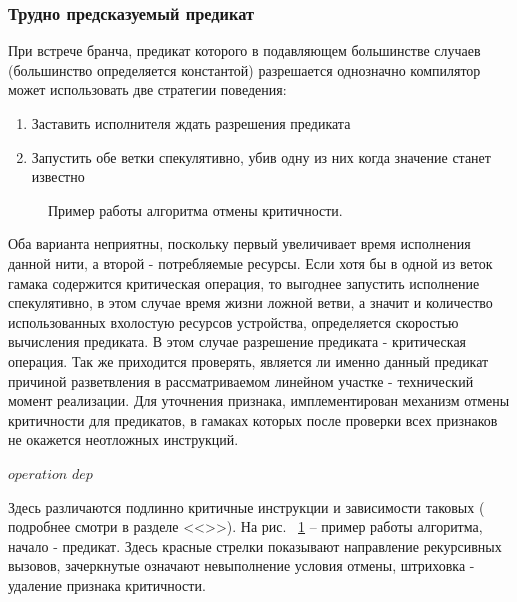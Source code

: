 \documentclass[a4paper,12pt,titlepage]{article}
\newcommand*{\fig}[1]{рис. ~{\ref{fig:#1}}}
\newcommand*{\chp}[1]{<<\nameref{chap:#1}>>}
\begin{document}
\subsubsection{Трудно предсказуемый предикат}
При встрече бранча, предикат которого в подавляющем большинстве случаев (большинство определяется константой) разрешается однозначно компилятор может использовать две стратегии поведения: 
\begin{enumerate}
	\item Заставить исполнителя ждать разрешения предиката
	\item Запустить обе ветки спекулятивно, убив одну из них когда значение станет известно
\end{enumerate}
\begin{figure}[h]
	\centering
	
	\caption{Пример работы алгоритма отмены критичности.}
	\label{fig:cancelation}
\end{figure}
Оба варианта неприятны, поскольку первый увеличивает время исполнения данной нити, а второй - потребляемые ресурсы. 
Если хотя бы в одной из веток гамака содержится критическая операция, то выгоднее запустить исполнение спекулятивно, в этом случае время жизни ложной ветви, а значит и количество использованных вхолостую ресурсов устройства, определяется скоростью вычисления предиката. В этом случае разрешение предиката - критическая операция.
 Так же приходится проверять, является ли именно данный предикат причиной разветвления в рассматриваемом линейном участке - технический момент реализации. Для уточнения признака, имплементирован механизм отмены критичности для предикатов, в гамаках которых после проверки всех признаков не окажется неотложных инструкций.
\begin{algorithmic}
	 { $operation$ }
			\State {} {$dep$}
			\EndFor
		\EndIf
	\EndFunction
\end{algorithmic}

Здесь различаются подлинно критичные инструкции и зависимости таковых ( подробнее смотри в разделе \chp{Propogation}). На \fig{cancelation} -- пример работы алгоритма, начало - предикат. Здесь красные стрелки показывают направление рекурсивных вызовов, зачеркнутые означают невыполнение условия отмены, штриховка - удаление признака критичности.
\end{document}
